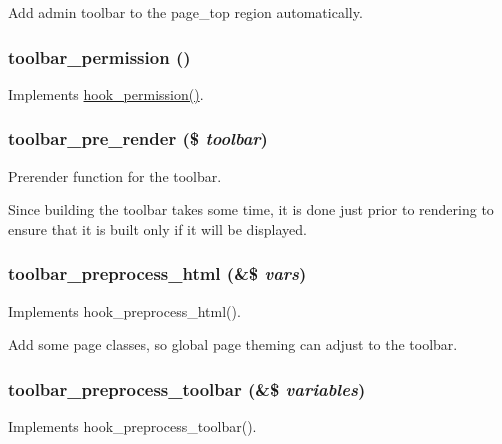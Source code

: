 Add admin toolbar to the page\_\-top region automatically. \hypertarget{toolbar_8module_af222824d9b7a9d28cd33800a9f2afea5}{
\subsubsection[{toolbar\_\-permission}]{\setlength{\rightskip}{0pt plus 5cm}toolbar\_\-permission ()}}
\label{toolbar_8module_af222824d9b7a9d28cd33800a9f2afea5}
Implements \hyperlink{group__hooks_ga2b22b45f4925f2478412477bae329713}{hook\_\-permission()}. \hypertarget{toolbar_8module_a17db359a6a69c506729e38ab314a8b6a}{
\subsubsection[{toolbar\_\-pre\_\-render}]{\setlength{\rightskip}{0pt plus 5cm}toolbar\_\-pre\_\-render (\$ {\em toolbar})}}
\label{toolbar_8module_a17db359a6a69c506729e38ab314a8b6a}
Prerender function for the toolbar.

Since building the toolbar takes some time, it is done just prior to rendering to ensure that it is built only if it will be displayed. \hypertarget{toolbar_8module_a2f497353c742b38175aab2bbedf75ee0}{
\subsubsection[{toolbar\_\-preprocess\_\-html}]{\setlength{\rightskip}{0pt plus 5cm}toolbar\_\-preprocess\_\-html (\&\$ {\em vars})}}
\label{toolbar_8module_a2f497353c742b38175aab2bbedf75ee0}
Implements hook\_\-preprocess\_\-html().

Add some page classes, so global page theming can adjust to the toolbar. \hypertarget{toolbar_8module_aec79d6b1e77e3d99e8d250caf9e5615d}{
\subsubsection[{toolbar\_\-preprocess\_\-toolbar}]{\setlength{\rightskip}{0pt plus 5cm}toolbar\_\-preprocess\_\-toolbar (\&\$ {\em variables})}}
\label{toolbar_8module_aec79d6b1e77e3d99e8d250caf9e5615d}
Implements hook\_\-preprocess\_\-toolbar().

